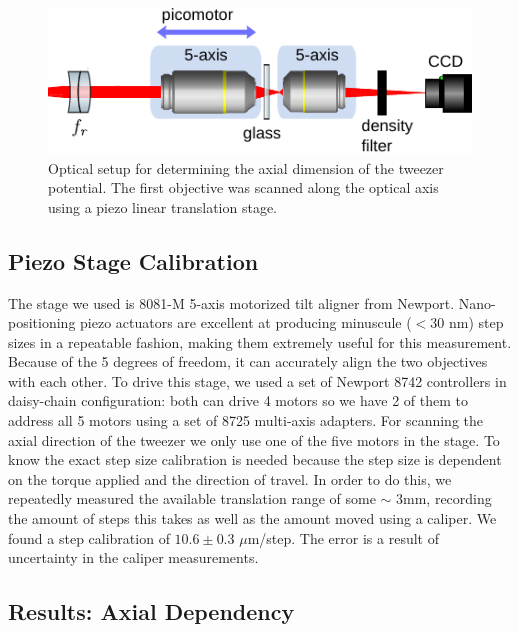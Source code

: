 \begin{figure}
    \centering
    \includegraphics[width=0.6\linewidth]{figures/Zscan.pdf}
    \caption{Optical setup for determining the axial dimension of the tweezer potential. The first objective was scanned along the optical axis using a piezo linear translation stage.}
    \label{fig:ZScanSetup}
\end{figure}


\subsection{Piezo Stage Calibration}

The stage we used is 8081-M 5-axis motorized tilt aligner from Newport. 
Nano-positioning piezo actuators are excellent at producing minuscule ($<30$ nm) step sizes in a repeatable fashion, making them extremely useful for this measurement.
Because of the 5 degrees of freedom, it can accurately align the two objectives with each other. 
To drive this stage, we used a set of Newport 8742 controllers in daisy-chain configuration: both can drive 4 motors so we have 2 of them to address all 5 motors using a set of 8725 multi-axis adapters.
For scanning the axial direction of the tweezer we only use one of the five motors in the stage. 
To know the exact step size calibration is needed because the step size is dependent on the torque applied and the direction of travel.
In order to do this, we repeatedly measured the available translation range of some $\sim$ 3mm, recording the amount of steps this takes as well as the amount moved using a caliper. 
We found a step calibration of $10.6 \pm 0.3$ $\mu$m/step.
The error is a result of uncertainty in the caliper measurements. 



\subsection{Results: Axial Dependency}

